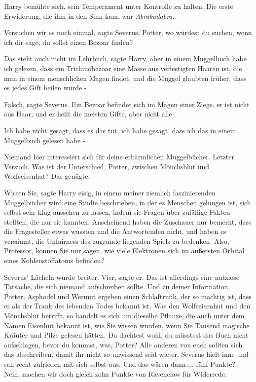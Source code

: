Harry bemühte sich, sein Temperament unter Kontrolle zu halten. Die erste
Erwiderung, die ihm in den Sinn kam, war \glqq{}\emph{Abrakadabra}\grqq{}.

\glqq{}Versuchen wir es noch einmal\grqq{}, sagte Severus. \glqq{}Potter, wo
würdest du suchen, wenn ich dir sage, du sollst einen Bezoar finden?\grqq{}

\glqq{}Das steht auch nicht im Lehrbuch\grqq{}, sagte Harry, \glqq{}aber in einem
Muggelbuch habe ich gelesen, dass ein Trichinobezoar eine Masse aus verfestigten
Haaren ist, die man in einem menschlichen Magen findet, und die Muggel glaubten
früher, dass es jedes Gift heilen würde -\grqq{}

\glqq{}Falsch\grqq{}, sagte Severus. \glqq{}Ein Bezoar befindet sich im Magen
einer Ziege, er ist nicht aus Haar, und er heilt die meisten Gifte, aber nicht
alle.\grqq{}

\glqq{}Ich habe nicht gesagt, dass es das tut, ich habe gesagt, dass ich das in
einem Muggelbuch gelesen habe -\grqq{}

\glqq{}Niemand hier interessiert sich für deine erbärmlichen Muggelbücher.
Letzter Versuch. Was ist der Unterschied, Potter, zwischen Mönchsblut und
Wolfseisenhut?\grqq{} Das genügte.

\glqq{}Wissen Sie\grqq{}, sagte Harry eisig, \glqq{}in einem meiner ziemlich
faszinierenden Muggelbücher wird eine Studie beschrieben, in der es Menschen
gelungen ist, sich selbst sehr klug aussehen zu lassen, indem sie Fragen über
zufällige Fakten stellten, die nur sie kannten. Anscheinend haben die Zuschauer
nur bemerkt, dass die Fragesteller etwas wussten und die Antwortenden nicht, und
haben es versäumt, die Unfairness des zugrunde liegenden Spiels zu bedenken.
Also, Professor, können Sie mir sagen, wie viele Elektronen sich im äußersten
Orbital eines Kohlenstoffatoms befinden?\grqq{}

Severus' Lächeln wurde breiter. \glqq{}Vier\grqq{}, sagte er. \glqq{}Das ist
allerdings eine nutzlose Tatsache, die sich niemand aufschreiben sollte. Und zu
deiner Information, Potter, Asphodel und Wermut ergeben einen Schlaftrunk, der
so mächtig ist, dass er als der Trank des lebenden Todes bekannt ist. Was den
Wolfseisenhut und den Mönchsblut betrifft, so handelt es sich um dieselbe
Pflanze, die auch unter dem Namen Eisenhut bekannt ist, wie Sie wissen würden,
wenn Sie Tausend magische Kräuter und Pilze gelesen hätten. Du dachtest wohl, du
müsstest das Buch nicht aufschlagen, bevor du kommst, was, Potter? Alle anderen
von euch sollten sich das abschreiben, damit ihr nicht so unwissend seid wie
er.\grqq{} Severus hielt inne und sah recht zufrieden mit sich selbst aus. \glqq{}
Und das wären dann ... fünf Punkte? Nein, machen wir doch gleich zehn Punkte von
Ravenclaw für Widerrede.\grqq{}

